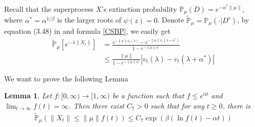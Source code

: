 \documentclass[12pt, a4paper]{amsart}
\newtheorem{lem}[thm]{Lemma}
\theoremstyle{definition}
\numberwithin{equation}{section}
\begin{document}
Recall that the superprocess $X$'s extinction probability $\mathbb{P}_{\mu}(D)=e^{-\alpha^*\|\mu\|}$, where $\alpha^*=\alpha^{1/\beta}$ is the larger roots of $\psi(z)=0$. Denote $\mathbb{\tilde{P}}_{\mu}=\mathbb{P}_{\mu}(\cdot|D^c)$, by equation (3.48) in\cite{Li2011Measure-valued} and formula \eqref{CSBP}, we easily get 
\begin{align}
    \mathbb{\tilde{P}}_{\mu}[e^{-\lambda \|X_t\|}]&=\frac{e^{-\|\mu\|v_t(\lambda)}-e^{-\|\mu\|v_t(\lambda+\alpha^*)}}{1-e^{-\|\mu\|\alpha^*}}\nonumber\\
        &\leq \frac{\|\mu\|}{1-e^{-\|\mu\|\alpha^*}}\left|v_t(\lambda)-v_t(\lambda+\alpha^*)\right| \label{laplaceexpress} 
\end{align}

We want to prove the following Lemma
\begin{lem}\label{lemma2_13}
Let $f:[0,\infty)\rightarrow[1,\infty)$ be a function such that $f\leq e^{\alpha t}$ and $\lim_{t\rightarrow \infty}f(t)=\infty$. Then there exist $C_7>0$ such that for any $t\geq 0$, there is
\begin{align}
    \mathbb{\tilde{P}}_{\mu}(\|X_t\|\leq \|\mu\|f(t))\leq C_7 \exp(\beta(\ln f(t)-\alpha t))
\end{align}
\end{lem}
\end{document}
